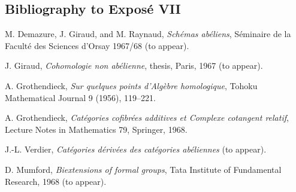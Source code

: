 \subsection*{Bibliography to Expos\'e VII}

\begin{enumerate}[label={[\arabic*]}]
\item M. Demazure, J. Giraud, and M. Raynaud,
\emph{Schémas abéliens}, Séminaire de la Faculté des Sciences
d'Orsay 1967/68 (to appear).
\item J. Giraud, \emph{Cohomologie non abélienne}, thesis, Paris,
1967 (to appear).
\item A. Grothendieck, \emph{Sur quelques points d'Algèbre
homologique}, Tohoku Mathematical Journal 9 (1956), 119--221.
\item A. Grothendieck, \emph{Catégories cofibrées additives et
Complexe cotangent relatif}, Lecture Notes in Mathematics 79,
Springer, 1968.
\item J.-L. Verdier, \emph{Catégories dérivées des catégories
abéliennes} (to appear).
\item D. Mumford, \emph{Biextensions of formal groups}, Tata
Institute of Fundamental Research, 1968 (to appear).
\end{enumerate}
